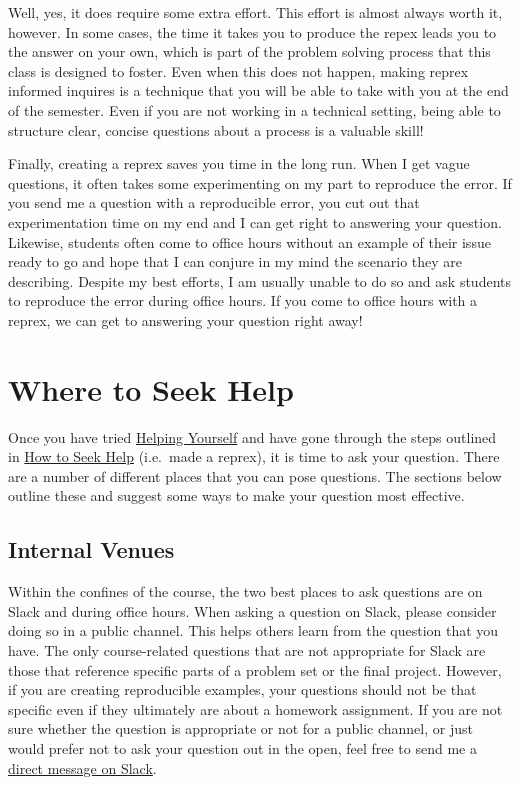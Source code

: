 \documentclass[]{book}
\theoremstyle{definition}
\theoremstyle{definition}
\theoremstyle{definition}
\theoremstyle{remark}
\begin{document}
Well, yes, it does require some extra effort. This effort is almost
always worth it, however. In some cases, the time it takes you to
produce the repex leads you to the answer on your own, which is part of
the problem solving process that this class is designed to foster. Even
when this does not happen, making reprex informed inquires is a
technique that you will be able to take with you at the end of the
semester. Even if you are not working in a technical setting, being able
to structure clear, concise questions about a process is a valuable
skill!

Finally, creating a reprex saves you time in the long run. When I get
vague questions, it often takes some experimenting on my part to
reproduce the error. If you send me a question with a reproducible
error, you cut out that experimentation time on my end and I can get
right to answering your question. Likewise, students often come to
office hours without an example of their issue ready to go and hope that
I can conjure in my mind the scenario they are describing. Despite my
best efforts, I am usually unable to do so and ask students to reproduce
the error during office hours. If you come to office hours with a
reprex, we can get to answering your question right away!

\section{Where to Seek Help}\label{where-to-seek-help}

Once you have tried \protect\hyperlink{helping-yourself}{Helping
Yourself} and have gone through the steps outlined in
\protect\hyperlink{how-to-seek-help}{How to Seek Help} (i.e.~made a
reprex), it is time to ask your question. There are a number of
different places that you can pose questions. The sections below outline
these and suggest some ways to make your question most effective.

\subsection{Internal Venues}\label{internal-venues}

Within the confines of the course, the two best places to ask questions
are on Slack and during office hours. When asking a question on Slack,
please consider doing so in a public channel. This helps others learn
from the question that you have. The only course-related questions that
are not appropriate for Slack are those that reference specific parts of
a problem set or the final project. However, if you are creating
reproducible examples, your questions should not be that specific even
if they ultimately are about a homework assignment. If you are not sure
whether the question is appropriate or not for a public channel, or just
would prefer not to ask your question out in the open, feel free to send
me a
\href{https://get.slack.help/hc/en-us/articles/212281468-Direct-messages-and-group-DMs}{direct
message on Slack}.
\end{document}
